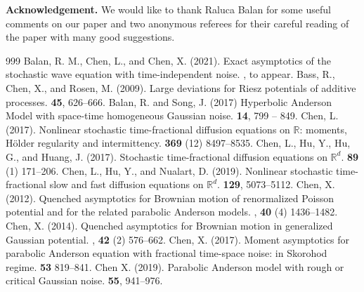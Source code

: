 \documentclass[a4paper,11pt]{article}
\numberwithin{equation}{section}
\numberwithin{equation}{section}
\theoremstyle{plain}
\theoremstyle{definition}
\newcommand{\R}{\mathbb{R}}
\begin{document}
{\bf Acknowledgement.}%
We would like to thank Raluca Balan for some useful comments on our paper and two anonymous referees
for their careful reading of the paper with many good suggestions.
\begin{thebibliography}{999}
  Balan, R. M., Chen, L., and Chen, X. (2021).
  \newblock Exact asymptotics of the stochastic wave equation with time-independent noise.
  , to appear.
  Bass, R., Chen, X., and Rosen, M. (2009).
  \newblock Large deviations for Riesz potentials of additive processes.
   \textbf{45}, 626--666.
  Balan, R. and Song, J. (2017)
  \newblock Hyperbolic Anderson Model with space-time homogeneous Gaussian noise.
   \textbf{14}, 799 -- 849.
  Chen, L. (2017).
  \newblock Nonlinear stochastic time-fractional diffusion equations on $\R$: moments, H\"older regularity and intermittency.
   \textbf{369} (12) 8497--8535.
  Chen, L., Hu, Y., Hu, G., and Huang, J. (2017).
  \newblock Stochastic time-fractional diffusion equations on $\R^d$.
   \textbf{89} (1) 171--206.
  Chen, L., Hu, Y., and Nualart, D. (2019).
  \newblock Nonlinear stochastic time-fractional slow and fast diffusion equations on $\R^d$.
   \textbf{129}, 5073--5112.
  Chen, X. (2012).
  \newblock Quenched asymptotics for Brownian motion of renormalized Poisson potential and for the related parabolic Anderson models.
  , \textbf{40} (4) 1436--1482.
  Chen, X. (2014).
  \newblock Quenched asymptotics for Brownian motion in generalized Gaussian potential.
  , \textbf{42} (2) 576--662.
  Chen, X. (2017).
  \newblock Moment asymptotics for parabolic Anderson equation with fractional time-space noise: in Skorohod regime.
   {\bf 53} 819--841.
  Chen X. (2019).
  \newblock Parabolic Anderson model with rough or critical Gaussian noise.
   \textbf{55}, 941--976.

\end{thebibliography}
\end{document}
